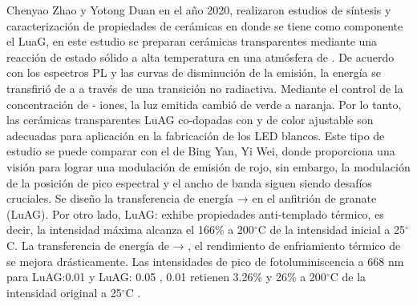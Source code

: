 Chenyao Zhao y Yotong Duan en el año 2020, realizaron estudios de síntesis y
caracterización de propiedades de cerámicas en donde se tiene como componente
el LuaG, en este estudio se preparan cerámicas transparentes mediante una
reacción de estado sólido a alta temperatura en una atmósfera de . De acuerdo
con los espectros PL y las curvas de disminución de la emisión, la energía se
transfirió de  a  a través de una transición no
radiactiva. Mediante el control de la concentración de
- iones, la luz emitida cambió de verde a naranja. Por
lo tanto, las cerámicas transparentes LuAG co-dopadas con  y  de color
ajustable son adecuadas para aplicación en la fabricación de los LED blancos\cite{Zhao2021}. 
Este tipo de estudio se puede comparar con el de Bing Yan, Yi
Wei,  donde proporciona una visión para lograr una modulación de emisión de
rojo, sin embargo, la modulación de la posición de pico espectral y el ancho de
banda siguen siendo desafíos cruciales. Se diseño la transferencia de energía
 →  en el anfitrión de granate  (LuAG).
Por otro lado, LuAG: exhibe propiedades anti-templado térmico, es
decir, la intensidad máxima alcanza el 166\% a 200$^{\circ}$C de la intensidad inicial a
25$^{\circ}$C. La transferencia de energía de  → , el
rendimiento de enfriamiento térmico de  se mejora drásticamente.
Las intensidades de pico de fotoluminiscencia a 668 nm para
LuAG:0.01 y LuAG: 0.05 , 0.01 retienen
3.26\% y 26\% a 200$^{\circ}$C de la intensidad original a 25$^{\circ}$C \cite{Yan2021}.\\

